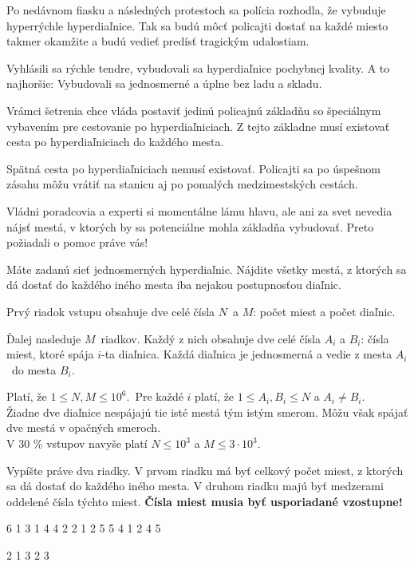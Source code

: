 





Po nedávnom fiasku a následných protestoch sa polícia rozhodla, že vybuduje
hyperrýchle hyperdiaľnice. Tak sa budú môcť policajti dostať na každé miesto takmer
okamžite a budú vedieť predísť tragickým udalostiam.

Vyhlásili sa rýchle tendre, vybudovali sa hyperdiaľnice pochybnej kvality. A to
najhoršie: Vybudovali sa jednosmerné a úplne bez ladu a skladu.

Vrámci šetrenia chce vláda postaviť jedinú policajnú základňu so špeciálnym
vybavením pre cestovanie po hyperdiaľniciach. Z tejto základne musí existovať
cesta po hyperdiaľniciach do každého mesta.

Spätná cesta po hyperdiaľniciach nemusí existovať. Policajti sa po úspešnom
zásahu môžu vrátiť na stanicu aj po pomalých medzimestských cestách.

Vládni poradcovia a experti si momentálne lámu hlavu, ale ani za svet nevedia
nájsť mestá, v ktorých by sa potenciálne mohla základňa vybudovať. Preto požiadali
o pomoc práve vás!


Máte zadanú sieť jednosmerných hyperdiaľnic. Nájdite všetky mestá, z ktorých
sa dá dostať do každého iného mesta iba nejakou postupnosťou diaľnic.


Prvý riadok vstupu obsahuje dve celé čísla $N$ a $M$: počet miest a počet
diaľnic.

Ďalej nasleduje $M$ riadkov. Každý z nich obsahuje dve celé čísla $A_i$ a $B_i$:
čísla miest, ktoré spája $i$-ta diaľnica. Každá diaľnica je jednosmerná a vedie
z mesta $A_i$ do mesta $B_i$.

\bigskip
\noindent
Platí, že $1 \leq N, M \leq 10^6$.\
Pre každé $i$ platí, že $1 \leq A_i, B_i \leq N$ a $A_i \neq B_i$.\\
Žiadne dve diaľnice nespájajú tie isté mestá tým istým smerom. Môžu však
spájať dve mestá v opačných smeroch. \\
V 30 \% vstupov navyše platí $N \leq 10^3$ a $M \leq 3 \cdot 10^3$.


Vypíšte práve dva riadky. V prvom riadku má byť celkový počet miest, z ktorých
sa dá dostať do každého iného mesta. V druhom riadku majú byť medzerami oddelené
čísla týchto miest. \textbf{Čísla miest musia byť usporiadané vzostupne!}


 6
1 3
1 4
4 2
2 1
2 5
5 4
1 2 4 5
\sampleEND

 2
1 3
2 3
~
\sampleEND


